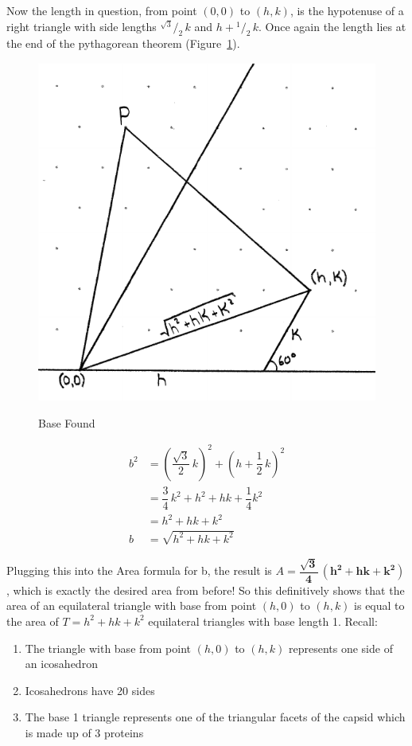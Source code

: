 \documentclass[12pt,letter]{article}
\newcommand*\rfrac[2]{{}^{#1}\!/_{#2}}
\begin{document}
Now the length in question, from point $(0,0)$ to $(h,k)$, is the hypotenuse of a right triangle with side lengths $\rfrac{\sqrt{3}} {2} \, k$ and $h+\rfrac 1 2 \, k$. Once again the length lies at the end of the pythagorean theorem (Figure~\ref{fig:equil_baselength}).

\begin{figure}[t!]
	\centering
	\caption{Base Found}
	\includegraphics[width=.45\textwidth]{ddagger3.pdf}
	\label{fig:equil_baselength}
	\vspace{-25pt}
\end{figure}

\begin{align*}
b^2 &= \left(\dfrac{\sqrt{3}} {2} \, k\right)^2 + \left(h+\dfrac 1 2 \, k\right)^2 \\
&= \dfrac 3 4 \, k^2 + h^2 + hk + \dfrac 1 4 k^2 \\
& = h^2 + hk + k^2 \\
b & = \sqrt{h^2 + hk + k^2}
\end{align*}

Plugging this into the Area formula for b, the result is $A = \mathbf{ \dfrac{\sqrt{3}} {4} \, (h^2 + hk + k^2) }$, which is exactly the desired area from before! So this definitively shows that the area of an equilateral triangle with base from point $(h,0)$ to $(h,k)$ is equal to the area of $T = h^2 + hk + k^2$ equilateral triangles with base length 1. Recall:

\begin{enumerate}
	\item The triangle with base from point $(h,0)$ to $(h,k)$ represents one side of an icosahedron
	\item Icosahedrons have 20 sides
	\item The base 1 triangle represents one of the triangular facets of the capsid which is made up of 3 proteins
\end{enumerate}
\end{document}
